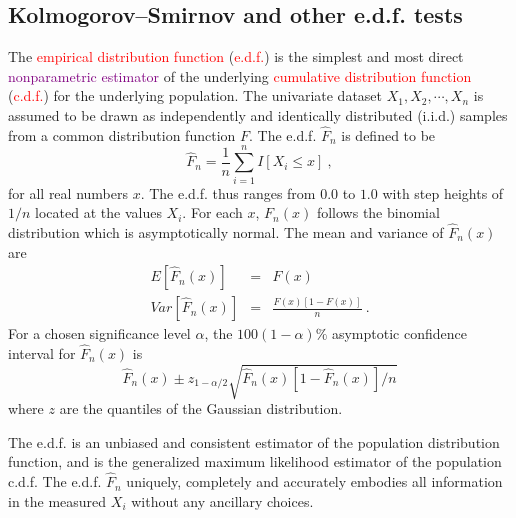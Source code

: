 \documentclass[12pt,a4paper]{article}
\begin{document}
\subsection{Kolmogorov–Smirnov and other e.d.f. tests}
The \textcolor{red}{empirical distribution function} (\textcolor{red}{e.d.f.}) is the simplest and most direct  \textcolor{purple}{nonparametric estimator} of the underlying \textcolor{red}{cumulative distribution function} (\textcolor{red}{c.d.f.}) for the underlying population. The univariate dataset $X_1, X_2, \cdots, X_n$ is assumed to be drawn as independently and identically distributed (i.i.d.) samples from a common distribution function $F$. The 
e.d.f. $\hat{F}_n$ is defined to be
\begin{equation}
\hat{F}_n = \frac{1}{n} \sum_{i=1}^n I[X_i \leqslant x] ~,
\end{equation}
for all real numbers $x$. The e.d.f. thus ranges from $0.0$ to $1.0$ with step heights of $1/n$ located at the values $X_i$. For each $x$, $F_n(x)$ follows the binomial distribution which is asymptotically normal. The mean and variance of $\hat{F}_n(x)$ are
\begin{eqnarray*}
E[\hat{F}_n(x)] &=& F(x) \\
Var[\hat{F}_n(x)] &=& \frac{F(x)[1-F(x)]}{n} ~.
\end{eqnarray*}
For a chosen significance level $\alpha$, the $100(1 -\alpha)\%$ asymptotic confidence interval for $\hat{F}_n(x)$ is 
\begin{equation}
\hat{F}_n(x) \pm z_{1-\alpha/2} \sqrt{\hat{F}_n(x) [1-\hat{F}_n(x)]/n}
\end{equation}
where $z$ are the quantiles of the Gaussian distribution. 

The e.d.f. is an unbiased and consistent estimator of the population distribution function, and is the generalized maximum likelihood estimator of the population c.d.f. The e.d.f. $\hat{F}_n$ uniquely, completely and accurately embodies all information in the measured $X_i$ without any ancillary choices.
\end{document}

